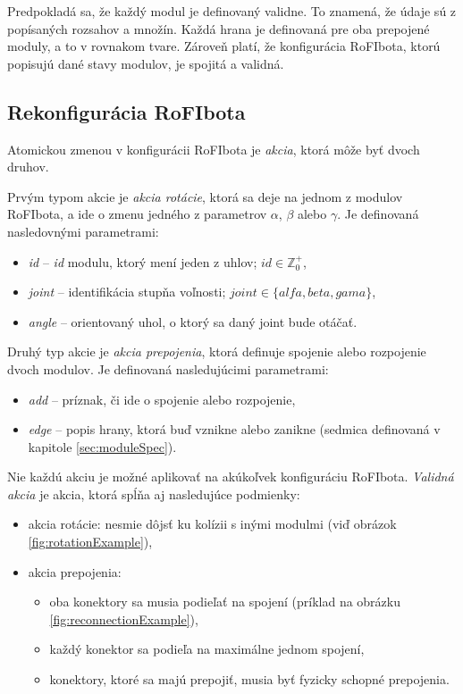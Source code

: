 \documentclass[
  printed, %
  oneside, %
  notable,   %
  nolof,     %
  nolot,     %
]{fithesis3}
\begin{document}
Predpokladá sa, že každý modul je definovaný validne. To znamená, že údaje sú z popísaných rozsahov a množín. Každá hrana je definovaná pre oba prepojené moduly, a to v rovnakom tvare. Zároveň platí, že konfigurácia RoFIbota, ktorú popisujú dané stavy modulov, je spojitá a validná. 

\subsection{Rekonfigurácia RoFIbota}
\label{sec:formalRecfg}
Atomickou zmenou v konfigurácii RoFIbota je \textit{akcia}, ktorá môže byť dvoch druhov. 

Prvým typom akcie je \textit{akcia rotácie}, ktorá sa deje na jednom z modulov RoFIbota, a ide o zmenu jedného z parametrov $\alpha$, $\beta$ alebo $\gamma$. Je definovaná nasledovnými parametrami: 
\begin{itemize}
    \item \textit{id} -- \textit{id} modulu, ktorý mení jeden z uhlov; $id \in \mathbb{Z}_0^+$, 
    \item \textit{joint} -- identifikácia stupňa voľnosti; $joint \in \{alfa, beta, gama\}$, 
    \item \textit{angle} -- orientovaný uhol, o ktorý sa daný joint bude otáčať. 
\end{itemize}

Druhý typ akcie je \textit{akcia prepojenia}, ktorá definuje spojenie alebo rozpojenie dvoch modulov. Je definovaná nasledujúcimi parametrami: 
\begin{itemize}
    \item \textit{add} -- príznak, či ide o spojenie alebo rozpojenie,
    \item \textit{edge} -- popis hrany, ktorá buď vznikne alebo zanikne (sedmica definovaná v kapitole \ref{sec:moduleSpec}). 
\end{itemize}

Nie každú akciu je možné aplikovať na akúkoľvek konfiguráciu RoFIbota. \textit{Validná akcia} je akcia, ktorá spĺňa aj nasledujúce podmienky:
\begin{itemize}
    \item akcia rotácie: nesmie dôjsť ku kolízii s inými modulmi (viď obrázok \ref{fig:rotationExample}), 
    \item akcia prepojenia: 
    \begin{itemize}[topsep=-5pt]
        \item oba konektory sa musia podieľať na spojení (príklad na obrázku \ref{fig:reconnectionExample}), 
        \item každý konektor sa podieľa na maximálne jednom spojení,
        \item konektory, ktoré sa majú prepojiť, musia byť fyzicky schopné prepojenia.
    \end{itemize}
\end{itemize}
\end{document}
